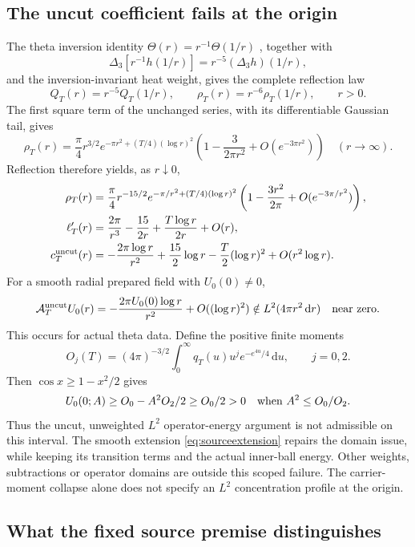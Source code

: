 \documentclass[11pt]{article}
\numberwithin{equation}{section}
\newcommand{\dd}{\,\mathrm d}
\begin{document}
\subsection{The uncut coefficient fails at the origin}

The theta inversion identity $\Theta(r)=r^{-1}\Theta(1/r)$
\cite{RadialNotes}, together with
\[
 \Delta_3[r^{-1}h(1/r)]=r^{-5}(\Delta_3h)(1/r),
\]
and the inversion-invariant heat weight, gives the complete reflection
law
\begin{equation}\label{eq:sourcereflection}
 Q_T(r)=r^{-5}Q_T(1/r),\qquad
 \rho_T(r)=r^{-6}\rho_T(1/r),\qquad r>0.
\end{equation}
The first square term of the unchanged series, with its differentiable
Gaussian tail, gives
\[
 \rho_T(r)=\frac\pi4r^{3/2}e^{-\pi r^2+(T/4)(\log r)^2}
 \left(1-\frac3{2\pi r^2}+O(e^{-3\pi r^2})\right)
 \quad(r\to\infty).
\]
Reflection therefore yields, as $r\downarrow0$,
\begin{align}
 \rho_T(r)&=\frac\pi4r^{-15/2}e^{-\pi/r^2+(T/4)(\log r)^2}
       \left(1-\frac{3r^2}{2\pi}+O(e^{-3\pi/r^2})\right),\nonumber\\
 \ell_T'(r)&=\frac{2\pi}{r^3}-\frac{15}{2r}
                   +\frac{T\log r}{2r}+O(r),\nonumber\\
 c_T^{\rm uncut}(r)&=-\frac{2\pi\log r}{r^2}
       +\frac{15}{2}\log r-\frac T2(\log r)^2+O(r^2\log r).
       \label{eq:sourceoriginsingularity}
\end{align}
For a smooth radial prepared field with $U_0(0)\ne0$,
\begin{equation}\label{eq:sourceoriginLtwo}
 \mathcal A_T^{\rm uncut}U_0(r)
   =-\frac{2\pi U_0(0)\log r}{r^2}+O((\log r)^2)
   \notin L^2(4\pi r^2\dd r)\quad\hbox{near zero}.
\end{equation}
This occurs for actual theta data. Define the positive finite moments
\[
 O_j(T)=(4\pi)^{-3/2}\int_0^\infty
          q_T(u)u^j e^{-e^{4u}/4}\dd u,\qquad j=0,2.
\]
Then $\cos x\ge1-x^2/2$ gives
\[
 U_0(0;A)\ge O_0-A^2O_2/2\ge O_0/2>0
       \quad\hbox{when }A^2\le O_0/O_2.
\]
Thus the uncut, unweighted $L^2$ operator-energy argument is not
admissible on this interval. The smooth extension
\eqref{eq:sourceextension} repairs the domain issue, while keeping
its transition terms and the actual inner-ball energy. Other weights,
subtractions or operator domains are outside this scoped failure.
The carrier-moment collapse alone does not specify an $L^2$
concentration profile at the origin.

\subsection{What the fixed source premise distinguishes}
\end{document}
